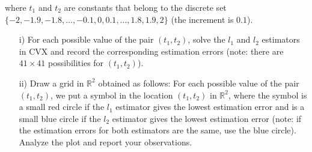 \begin{homeworkProblem}
    where $t_1$ and $t_2$ are constants that belong to the discrete set 
    $\{-2, -1.9, -1.8, ..., -0.1, 0, 0.1, ..., 1.8, 1.9, 2\}$ (the increment 
    is $0.1$).
    
    \begin{itemize}
        \item [i)] For each possible value of the pair $(t_1, t_2)$, solve the 
            $l_1$ and $l_2$ estimators in CVX and record the corresponding 
            estimation errors (note: there are $41 \times 41$ possibilities 
            for $(t_1, t_2)$). 
        \item [ii)] Draw a grid in $\mathbb R^2$ obtained as follows: For each 
            possible value of the pair $(t_1, t_2)$, we put a symbol in the 
            location $(t_1, t_2)$ in $\mathbb R^2$, where the symbol is a small 
            red circle if the $l_1$ estimator gives the lowest estimation error 
            and is a small blue circle if the $l_2$ estimator gives the lowest 
            estimation error (note: if the estimation errors for both 
            estimators are the same, use the blue circle). Analyze the plot 
            and report your observations. 
    \end{itemize}



\end{homeworkProblem}